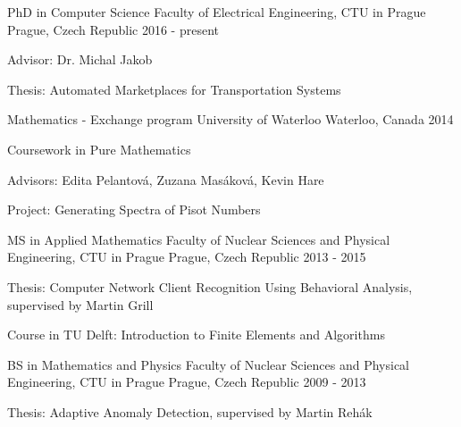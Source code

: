 

\begin{cventries}

  \cventry
    {PhD in Computer Science} %
    {Faculty of Electrical Engineering, CTU in Prague} %
    {Prague, Czech Republic} %
    {2016 - present} %
    {
      \begin{cvitems} %
        \item {Advisor: Dr. Michal Jakob}
        \item {Thesis: Automated Marketplaces for Transportation Systems}
      \end{cvitems}
    }

  \cventry
    {Mathematics - Exchange program} %
    {University of Waterloo}%
    {Waterloo, Canada} %
    {2014} %
    {
      \begin{cvitems} %
        \item {Coursework in Pure Mathematics}
        \item {Advisors: Edita Pelantová, Zuzana Masáková, Kevin Hare}
        \item {Project: Generating Spectra of Pisot Numbers}
      \end{cvitems}
    }

  \cventry
    {MS in Applied Mathematics} %
    {Faculty of Nuclear Sciences and Physical Engineering, CTU in Prague} %
    {Prague, Czech Republic} %
    {2013 - 2015} %
    {
      \begin{cvitems} %
        \item {Thesis: Computer Network Client Recognition Using Behavioral Analysis, supervised by Martin Grill}
        \item {Course in TU Delft: Introduction to Finite Elements and Algorithms}
      \end{cvitems}
    }

  \cventry
    {BS in Mathematics and Physics} %
    {Faculty of Nuclear Sciences and Physical Engineering, CTU in Prague} %
    {Prague, Czech Republic} %
    {2009 - 2013} %
    {
      \begin{cvitems} %
        \item {Thesis: Adaptive Anomaly Detection, supervised by Martin Rehák }
      \end{cvitems}
    }

\end{cventries}
